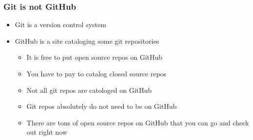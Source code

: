 \documentclass[unknownkeysallowed]{beamer}
\begin{document}
\begin{frame}

\end{frame}

\begin{frame}
    \frametitle{Git is not GitHub}
    \begin{itemize}
        \item{Git is a version control system}
        \item{GitHub is a site cataloging some git repositories}
            \begin{itemize}
                \item{It is free to put open source repos on GitHub}
                \item{You have to pay to catalog closed source repos}
                \item{Not all git repos are catologed on GitHub}
                \item{Git repos absolutely do not need to be on GitHub}
                \item{There are tons of open source repos on GitHub that you can go and check out right now}
           \end{itemize}
    \end{itemize}
    \vspace{1cm} %
\end{frame}
\end{document}
